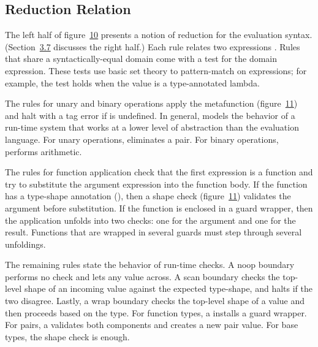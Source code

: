 \documentclass[screen=true, natbib=false, 10pt, sigplan]{acmart}
\newcommand{\SecRefUC}[2]{Section~#1}
\newcommand{\SectionNumberLink}[2]{\hyperref[#1]{#2}}
\let\SOriginalthesubsubsection\thesubsubsection
\newcommand{\Ssubsection}[2]{\subsection[#1]{#2}\let\thesubsubsection\SOriginalthesubsubsection}
\newcommand{\FigureRef}[2]{#1}
\begin{document}
\Ssubsection{Reduction Relation}{Reduction Relation}\label{t:x28part_x22secx3amodelx3amodelx3areductionx22x29}

The left half of figure~\hyperref[t:x28counter_x28x22figurex22_x22figx3amodelx3arrx22x29x29]{\FigureRef{10}{t:x28counter_x28x22figurex22_x22figx3amodelx3arrx22x29x29}} presents a notion of reduction for
the evaluation syntax.
(\SecRefUC{\SectionNumberLink{t:x28part_x22secx3amodelx3amodelx3aownershipx22x29}{3.7}}{Labeled Evaluation, Deep Label Consistency} discusses the right half.)
Each rule relates two expressions \relax{$(\sexpr \snr \sexpr)$}.
Rules that share a syntactically{-}equal domain come with a test
for the domain expression.
These tests use basic set theory to pattern{-}match on expressions;
for example, the test \relax{$(\svalue_0 \in \efun{\tann{\svar}{\stype}}{\sexpr})$} holds when
the value  is a type{-}annotated lambda.

The rules for unary and binary operations apply the \relax{$\sdelta$}
metafunction (figure~\hyperref[t:x28counter_x28x22figurex22_x22figx3amodelx3aextrax2drrx22x29x29]{\FigureRef{11}{t:x28counter_x28x22figurex22_x22figx3amodelx3aextrax2drrx22x29x29}}) and halt with a tag error if
\relax{$\sdelta$} is undefined.
In general, \relax{$\sdelta$} models the behavior of a run{-}time system that works
at a lower level of abstraction than the evaluation language.
For unary operations, \relax{$\sdelta$} eliminates a pair.
For binary operations, \relax{$\sdelta$} performs arithmetic.

The rules for function application check that the first expression is a
function and try to substitute the argument expression into the function
body.
If the function has a type{-}shape annotation (\relax{$\sshape$}), then a shape check
(figure~\hyperref[t:x28counter_x28x22figurex22_x22figx3amodelx3aextrax2drrx22x29x29]{\FigureRef{11}{t:x28counter_x28x22figurex22_x22figx3amodelx3aextrax2drrx22x29x29}}) validates the argument before substitution.
If the function is enclosed in a guard wrapper, then the application
unfolds into two \relax{$\swrap$} checks: one for the argument and one for
the result.
Functions that are wrapped in several guards must step through several
unfoldings.

The remaining rules state the behavior of run{-}time checks.
A noop boundary performs no check and lets any value across.
A scan boundary checks the top{-}level shape of an incoming value against the
expected type{-}shape, and halts if the two disagree.
Lastly, a wrap boundary checks the top{-}level shape of a value and
then proceeds based on the type.
For function types, a \relax{$\swrap$} installs a guard wrapper.
For pairs, a \relax{$\swrap$} validates both components and creates a new pair value.
For base types, the shape check is enough.
\end{document}
